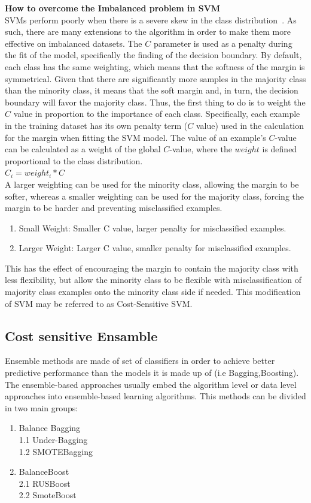 \textbf{How to overcome the Imbalanced problem in SVM}  \\
 SVMs perform poorly when there is a severe skew in the class distribution~\cite{tang2008svms}. As such, there are many extensions to the algorithm in order to make them more effective on imbalanced datasets.
The $C$ parameter is used as a penalty during the fit of the model, specifically the finding of the decision boundary. By default, each class has the same weighting, which means that the softness of the margin is symmetrical.
Given that there are significantly more samples in the majority class than the minority class, it means that the soft margin and, in turn, the decision boundary will favor the majority class.
Thus, the first thing to do is to weight the $C$ value in proportion to the importance of each class.
Specifically, each example in the training dataset has its own penalty term ($C$ value) used in the calculation for the margin when fitting the SVM model. The value of an example’s $C$-value can be calculated as a weight of the global $C$-value, where the $weight$ is defined proportional to the class distribution. \\
$ C_i = weight_i * C $  \\

A larger weighting can be used for the minority class, allowing the margin to be softer, whereas a smaller weighting can be used for the majority class, forcing the margin to be harder and preventing misclassified examples.
\begin{enumerate}
\item{Small Weight: Smaller C value, larger penalty for misclassified examples.}
\item{Larger Weight: Larger C value, smaller penalty for misclassified examples.}
\end{enumerate}
This has the effect of encouraging the margin to contain the majority class with less flexibility, but allow the minority class to be flexible with misclassification of majority class examples onto the minority class side if needed. This modification of SVM may be referred to as Cost-Sensitive SVM.


\subsection{Cost sensitive Ensamble}
Ensemble methods are made of set of classifiers in order to  achieve better predictive performance than the models it is made up of (i.e Bagging,Boosting).
The ensemble-based approaches usually embed the algorithm level or data level approaches into ensemble-based learning algorithms.
This methods can be divided in two main groups: 
\begin{enumerate}
\item{ Balance Bagging  \\
   1.1 Under-Bagging  \\
   1.2 SMOTEBagging } 
\item{ BalanceBoost   \\
    2.1 RUSBoost  \\
    2.2 SmoteBoost}  \\
\end{enumerate}
    
